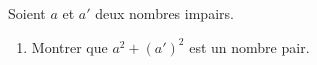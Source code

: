 \begin{exo}{}
	Soient $a$ et $a'$ deux nombres impairs.
	\begin{enumerate}
		\item Montrer que $a^2 + (a')^2$ est un nombre pair.
	\end{enumerate}
\end{exo}
